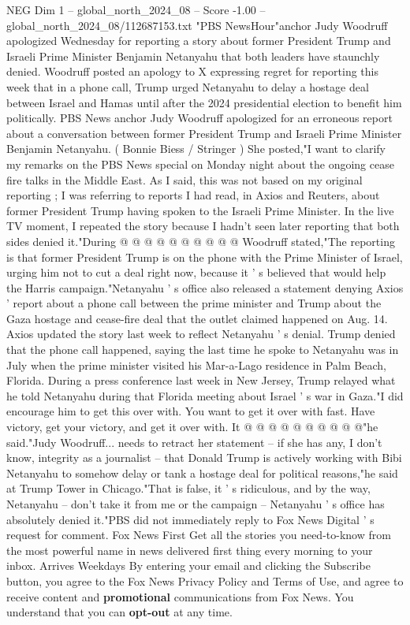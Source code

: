 \begin{textsample}{NEG Dim 1 – global\_north\_2024\_08 – Score -1.00 – global\_north\_2024\_08/112687153.txt}  \label{ex:f1_neg_041}
"PBS NewsHour"anchor Judy Woodruff apologized Wednesday for reporting a story about former President Trump and Israeli Prime Minister Benjamin Netanyahu that both leaders have staunchly denied.
Woodruff posted an apology to X expressing regret for reporting this week that in a phone call, Trump urged Netanyahu to delay a hostage deal between Israel and Hamas until after the 2024 presidential election to benefit him politically.
PBS News anchor Judy Woodruff apologized for an erroneous report about a conversation between former President Trump and Israeli Prime Minister Benjamin Netanyahu. ( Bonnie Biess / Stringer ) She posted,"I want to clarify my remarks on the PBS News special on Monday night about the ongoing cease fire talks in the Middle East.
As I said, this was not based on my original reporting ; I was referring to reports I had read, in Axios and Reuters, about former President Trump having spoken to the Israeli Prime Minister.
In the live TV moment, I repeated the story because I hadn't seen later reporting that both sides denied it."During @ @ @ @ @ @ @ @ @ @ Woodruff stated,"The reporting is that former President Trump is on the phone with the Prime Minister of Israel, urging him not to cut a deal right now, because it ' s believed that would help the Harris campaign."Netanyahu ' s office also released a statement denying Axios ' report about a phone call between the prime minister and Trump about the Gaza hostage and cease-fire deal that the outlet claimed happened on Aug. 14.
Axios updated the story last week to reflect Netanyahu ' s denial.
Trump denied that the phone call happened, saying the last time he spoke to Netanyahu was in July when the prime minister visited his Mar-a-Lago residence in Palm Beach, Florida.
During a press conference last week in New Jersey, Trump relayed what he told Netanyahu during that Florida meeting about Israel ' s war in Gaza."I did encourage him to get this over with.
You want to get it over with fast.
Have victory, get your victory, and get it over with.
It @ @ @ @ @ @ @ @ @ @"he said."Judy Woodruff... needs to retract her statement -- if she has any, I don't know, integrity as a journalist -- that Donald Trump is actively working with Bibi Netanyahu to somehow delay or tank a hostage deal for political reasons,"he said at Trump Tower in Chicago."That is false, it ' s ridiculous, and by the way, Netanyahu -- don't take it from me or the campaign -- Netanyahu ' s office has absolutely denied it."PBS did not immediately reply to Fox News Digital ' s request for comment.
Fox News First Get all the stories you need-to-know from the most powerful name in news delivered first thing every morning to your inbox.
Arrives Weekdays By entering your email and clicking the Subscribe button, you agree to the Fox News Privacy Policy and Terms of Use, and agree to receive content and \textbf{promotional} communications from Fox News.
You understand that you can \textbf{opt-out} at any time.

\end{textsample}

